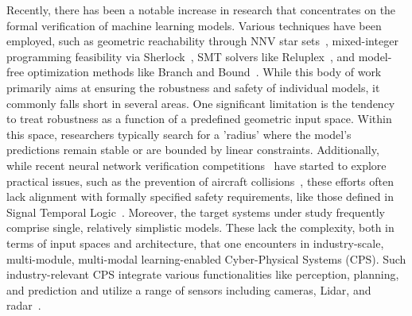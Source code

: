 Recently, there has been a notable increase in research that concentrates on the formal verification of machine learning models. Various techniques have been employed, such as geometric reachability through NNV star sets~\cite{tran2020verification}, mixed-integer programming feasibility via Sherlock~\cite{dutta2019sherlock}, SMT solvers like Reluplex~\cite{katz2017reluplex}, and model-free optimization methods like Branch and Bound~\cite{bunel2018unified}. While this body of work primarily aims at ensuring the robustness and safety of individual models, it commonly falls short in several areas. One significant limitation is the tendency to treat robustness as a function of a predefined geometric input space. Within this space, researchers typically search for a 'radius' where the model's predictions remain stable or are bounded by linear constraints. Additionally, while recent neural network verification competitions~\cite{bak2021second} have started to explore practical issues, such as the prevention of aircraft collisions~\cite{owen2019acas}, these efforts often lack alignment with formally specified safety requirements, like those defined in Signal Temporal Logic~\cite{donze2010robust}. Moreover, the target systems under study frequently comprise single, relatively simplistic models. These lack the complexity, both in terms of input spaces and architecture, that one encounters in industry-scale, multi-module, multi-modal learning-enabled Cyber-Physical Systems (CPS). Such industry-relevant CPS integrate various functionalities like perception, planning, and prediction and utilize a range of sensors including cameras, Lidar, and radar~\cite{lou2022testing,prakash2021multi}.


